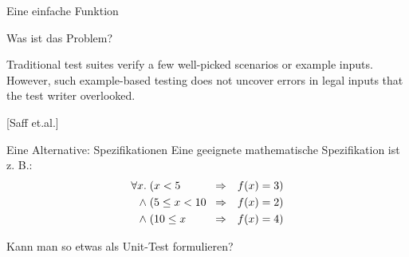 \begin{frame}[t,fragile]{Eine einfache Funktion}
\begin{minipage}[t]{4.5cm}
\end{minipage}

\end{frame}

\begin{frame}{Was ist das Problem?}

\glqq{}Traditional test suites verify a few well-picked scenarios or example inputs. However, such example-based testing does not uncover errors in legal inputs that the test writer overlooked.\grqq{}

\hfill[Saff et.al.]

\end{frame}

\begin{frame}{Eine Alternative: Spezifikationen}
Eine geeignete mathematische Spezifikation ist z. B.:
\begin{eqnarray*}
\forall x. \; \parbox{2cm}{$(x < 5$} &\Rightarrow& f(x) = 3) \\
\land \; \parbox{2cm}{$(5 \leq x < 10$} &\Rightarrow& f(x) = 2)\\
\land \; \parbox{2cm}{$(10 \leq x$} &\Rightarrow& f(x) = 4)
\end{eqnarray*}

Kann man so etwas als Unit-Test formulieren?
\end{frame}





